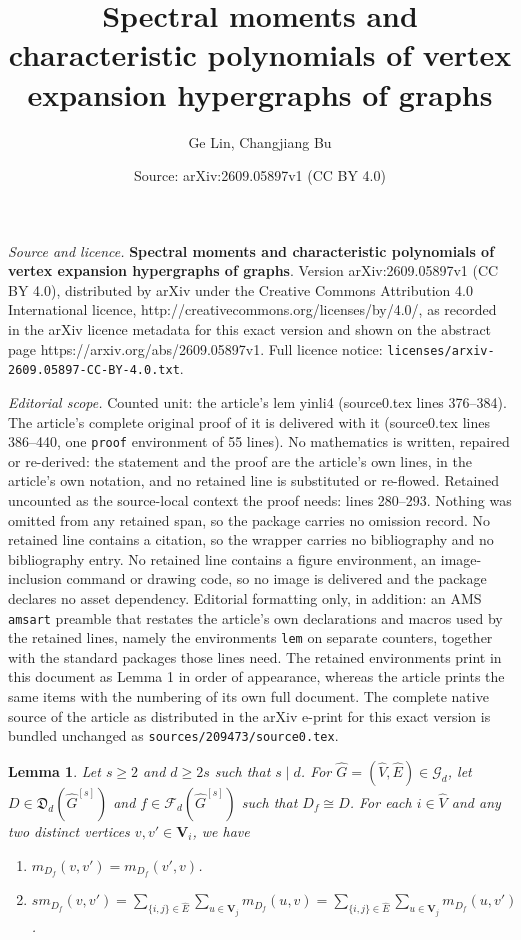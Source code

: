 \documentclass[10pt,a4paper]{amsart}
\title{\textbf{Spectral moments and characteristic polynomials of vertex expansion hypergraphs of graphs}}
\author{Ge Lin, Changjiang Bu}
\date{Source: arXiv:2609.05897v1 (CC BY 4.0)}
\newtheorem{lem}{Lemma}
\begin{document}
\maketitle

\noindent\emph{Source and licence.} \textbf{Spectral moments and characteristic polynomials of vertex expansion hypergraphs of graphs}. Version arXiv:2609.05897v1 (CC BY 4.0), distributed by arXiv under the Creative Commons Attribution 4.0 International licence, http://creativecommons.org/licenses/by/4.0/, as recorded in the arXiv licence metadata for this exact version and shown on the abstract page https://arxiv.org/abs/2609.05897v1. Full licence notice: \texttt{licenses/arxiv-2609.05897-CC-BY-4.0.txt}.\par\smallskip

\noindent\textit{Editorial scope.} Counted unit: the article's lem yinli4 (source0.tex lines 376--384). The article's complete original proof of it is delivered with it (source0.tex lines 386--440, one \texttt{proof} environment of 55 lines). No mathematics is written, repaired or re-derived: the statement and the proof are the article's own lines, in the article's own notation, and no retained line is substituted or re-flowed.  Retained uncounted as the source-local context the proof needs: lines 280--293.  Nothing was omitted from any retained span, so the package carries no omission record.  No retained line contains a citation, so the wrapper carries no bibliography and no bibliography entry.  No retained line contains a figure environment, an image-inclusion command or drawing code, so no image is delivered and the package declares no asset dependency.  Editorial formatting only, in addition: an AMS \texttt{amsart} preamble that restates the article's own declarations and macros used by the retained lines, namely the environments \texttt{lem} on separate counters, together with the standard packages those lines need.  The retained environments print in this document as Lemma 1 in order of appearance, whereas the article prints the same items with the numbering of its own full document.  The complete native source of the article as distributed in the arXiv e-print for this exact version is bundled unchanged as \texttt{sources/209473/source0.tex}.
\begin{lem}\label{yinli3}
Let $s \geq 2$ and $d \geq 2s$ such that $s \mid d$.
For $\widehat{G} = (\widehat{V},\widehat{E}) \in \mathcal{G}_{d}$,
let $D \in \mathfrak{D}_{d}(\widehat{G}^{[s]})$ and $f \in \mathcal{F}_{d}(\widehat{G}^{[s]})$ such that $D_{f} \cong D$.
For each $i \in \widehat{V}$ and any two distinct vertices $v,v' \in \mathbf{V}_{i}$,
we have
\begin{enumerate}

\item[(a)] $m_{D_f}(v,v')=m_{D_f}(v',v)$.

\item[(b)] $sm_{D_f}(v,v')=\sum_{\{i,j\} \in \widehat{E}}\sum_{u \in \mathbf{V}_{j}}m_{D_f}(u,v)=\sum_{\{i,j\} \in \widehat{E}}\sum_{u \in \mathbf{V}_{j}}m_{D_f}(u,v')$.

\end{enumerate}
\end{lem}
\end{document}
